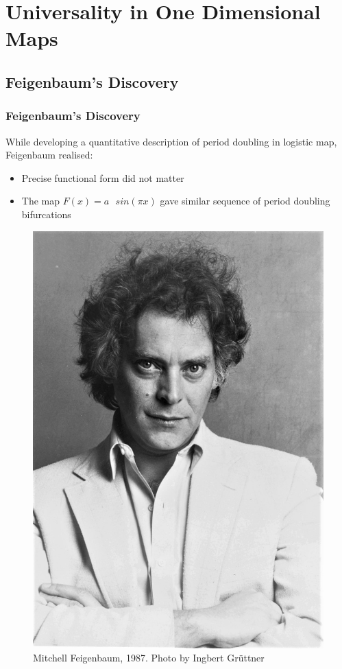 \documentclass[
	11pt, %
	aspectratio=169, %
]{beamer}
\begin{document}

\section{Universality in One Dimensional Maps}
\subsection{Feigenbaum's Discovery}

\begin{frame}
	\frametitle{Feigenbaum's Discovery}
	While developing a quantitative description of        period doubling in logistic map, Feigenbaum  
        realised: 
	\begin{itemize}
        \item  Precise functional form did not matter \pause
        \item The map {\color{red}$F(x) = a\text{ }sin(\pi x)$} gave similar sequence of period doubling bifurcations \pause
    \end{itemize}

    \begin{figure}
		\includegraphics[width=0.15\linewidth]{feigenbaum.jpg}
		\caption{Mitchell Feigenbaum, 1987. Photo by Ingbert Grüttner}
	\end{figure}

\end{frame}

\end{document}

